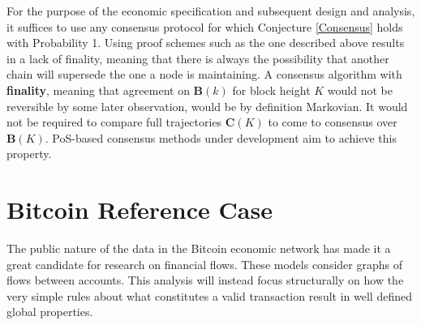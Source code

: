 \documentclass[letterpaper, 10 pt, conference]{ieeeconf}  %
\begin{document}
For the purpose of the economic specification and subsequent design and analysis, it suffices to use any consensus protocol for which Conjecture \ref{Consensus} holds with Probability 1. Using proof schemes such as the one described above results in a lack of finality, meaning that there is always the possibility that another chain will supersede the one a node is maintaining. A consensus algorithm with \textbf{finality}, meaning that agreement on $\mathbf{B}(k)$ for block height $K$ would not be reversible by some later observation, would be by definition Markovian. It would not be required to compare full trajectories $\mathbf{C}(K)$ to come to consensus over $\mathbf{B}(K)$. PoS-based consensus methods under development aim to achieve this property.



\section{Bitcoin Reference Case} \label{sec:Bitcoin}

The public nature of the data in the Bitcoin economic network has made it a great candidate for research on financial flows. These models consider graphs of flows between accounts. This analysis will instead focus structurally on how the very simple rules about what constitutes a valid transaction result in well defined global properties.
\end{document}
